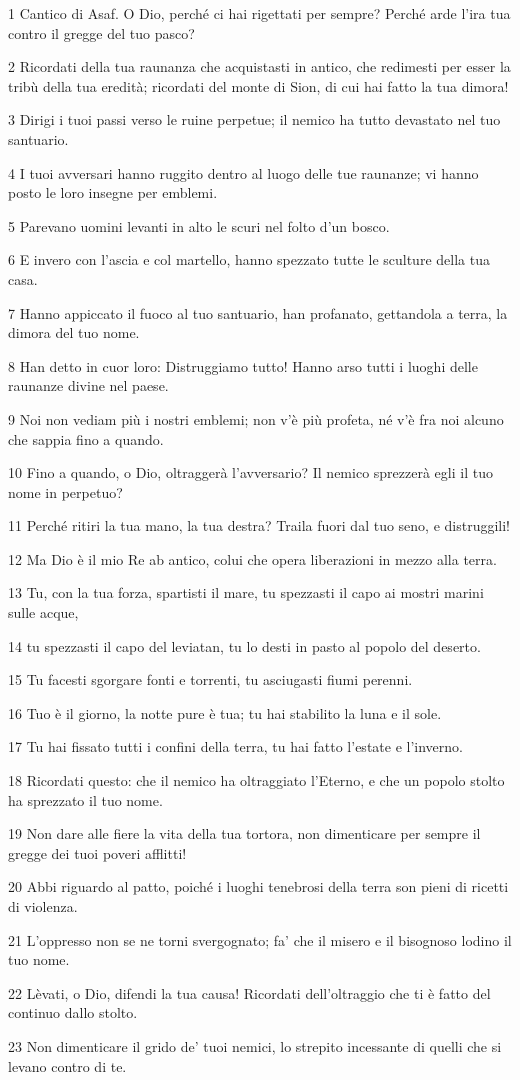 \par 1 Cantico di Asaf. O Dio, perché ci hai rigettati per sempre? Perché arde l'ira tua contro il gregge del tuo pasco?
\par 2 Ricordati della tua raunanza che acquistasti in antico, che redimesti per esser la tribù della tua eredità; ricordati del monte di Sion, di cui hai fatto la tua dimora!
\par 3 Dirigi i tuoi passi verso le ruine perpetue; il nemico ha tutto devastato nel tuo santuario.
\par 4 I tuoi avversari hanno ruggito dentro al luogo delle tue raunanze; vi hanno posto le loro insegne per emblemi.
\par 5 Parevano uomini levanti in alto le scuri nel folto d'un bosco.
\par 6 E invero con l'ascia e col martello, hanno spezzato tutte le sculture della tua casa.
\par 7 Hanno appiccato il fuoco al tuo santuario, han profanato, gettandola a terra, la dimora del tuo nome.
\par 8 Han detto in cuor loro: Distruggiamo tutto! Hanno arso tutti i luoghi delle raunanze divine nel paese.
\par 9 Noi non vediam più i nostri emblemi; non v'è più profeta, né v'è fra noi alcuno che sappia fino a quando.
\par 10 Fino a quando, o Dio, oltraggerà l'avversario? Il nemico sprezzerà egli il tuo nome in perpetuo?
\par 11 Perché ritiri la tua mano, la tua destra? Traila fuori dal tuo seno, e distruggili!
\par 12 Ma Dio è il mio Re ab antico, colui che opera liberazioni in mezzo alla terra.
\par 13 Tu, con la tua forza, spartisti il mare, tu spezzasti il capo ai mostri marini sulle acque,
\par 14 tu spezzasti il capo del leviatan, tu lo desti in pasto al popolo del deserto.
\par 15 Tu facesti sgorgare fonti e torrenti, tu asciugasti fiumi perenni.
\par 16 Tuo è il giorno, la notte pure è tua; tu hai stabilito la luna e il sole.
\par 17 Tu hai fissato tutti i confini della terra, tu hai fatto l'estate e l'inverno.
\par 18 Ricordati questo: che il nemico ha oltraggiato l'Eterno, e che un popolo stolto ha sprezzato il tuo nome.
\par 19 Non dare alle fiere la vita della tua tortora, non dimenticare per sempre il gregge dei tuoi poveri afflitti!
\par 20 Abbi riguardo al patto, poiché i luoghi tenebrosi della terra son pieni di ricetti di violenza.
\par 21 L'oppresso non se ne torni svergognato; fa' che il misero e il bisognoso lodino il tuo nome.
\par 22 Lèvati, o Dio, difendi la tua causa! Ricordati dell'oltraggio che ti è fatto del continuo dallo stolto.
\par 23 Non dimenticare il grido de' tuoi nemici, lo strepito incessante di quelli che si levano contro di te.

